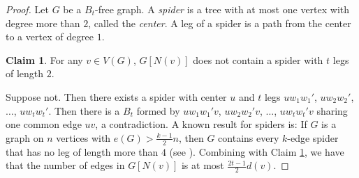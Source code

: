 \documentclass[11pt,a4paper]{article}
\theoremstyle{definition}
\newtheorem{claimthm}{Claim}[section]
\newenvironment{claimproof}
  {\renewcommand{\qedsymbol}{\ensuremath{\blacksquare}}\proof}
  {\endproof}
  {\endproof}
\begin{document}
        \begin{proof}
            Let $G$ be a $B_t$-free graph.
            A \emph{spider} is a tree with at most one vertex with degree more than $2$, called the \emph{center}.
            A leg of a spider is a path from the center to a vertex of degree $1$.

            \begin{claimthm}\label{cla: 211}
                For any $v \in V(G)$, $G[N(v)]$ does not contain a spider with $t$ legs of length $2$.
            \end{claimthm}
            \begin{claimproof}
                Suppose not. Then there exists a spider with center $u$ and $t$ legs $u w_1 w_1'$, $u w_2 w_2'$, $\dots$, $u w_t w_t'$.
                Then there is a $B_t$ formed by $u w_1 w_1' v$, $u w_2 w_2' v$, $\dots$, $u w_t w_t' v$ sharing one common edge $uv$, a contradiction.
            \end{claimproof}
            A known result for spiders is: If $G$ is a graph on $n$ vertices with $e(G) > \frac{k-1}{2} n$, then $G$ contains every $k$-edge spider that has no leg of length more than $4$ (see \cite{FanThe2007, WozniakOn1996}).
            Combining with Claim \ref{cla: 211}, we have that the number of edges in $G[N(v)]$ is at most $\frac{2t - 1}{2} d(v)$.


            

\end{proof}
\end{document}
